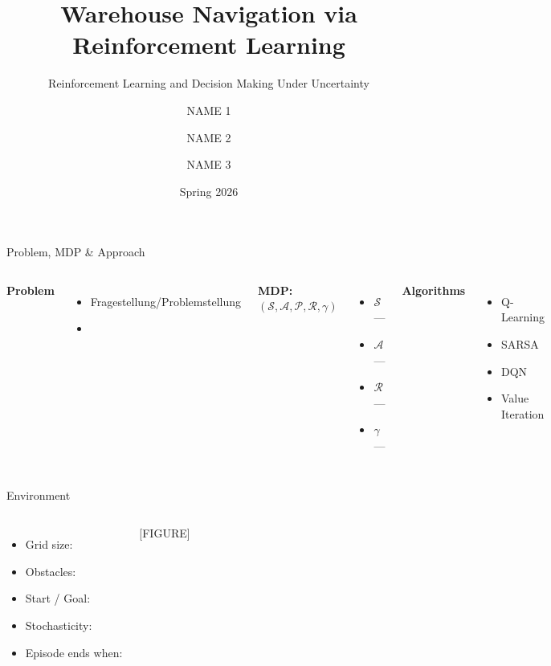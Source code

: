 \documentclass[aspectratio=169]{beamer}
\title{Warehouse Navigation via Reinforcement Learning}
\subtitle{Reinforcement Learning and Decision Making Under Uncertainty}
\author{NAME 1 \and NAME 2 \and NAME 3}
\institute{University Name}
\date{Spring 2026}
\newcommand{\states}{\ensuremath{\mathcal{S}}}
\newcommand{\actions}{\ensuremath{\mathcal{A}}}
\newcommand{\reward}{\ensuremath{\mathcal{R}}}
\newcommand{\transition}{\ensuremath{\mathcal{P}}}
\newcommand{\discount}{\ensuremath{\gamma}}
\begin{document}
\begin{frame}
  \titlepage
\end{frame}

\begin{frame}{Problem, MDP \& Approach}
  \begin{columns}
      \textbf{Problem}
      \begin{itemize}
        \item Fragestellung/Problemstellung
        \item
      \end{itemize}
      \textbf{MDP: } $(\states, \actions, \transition, \reward, \discount)$
      \begin{itemize}
        \item $\states$ —
        \item $\actions$ —
        \item $\reward$ —
        \item $\discount$ —
      \end{itemize}
      \textbf{Algorithms}
      \begin{itemize}
        \item Q-Learning
        \item SARSA
        \item DQN
        \item Value Iteration
      \end{itemize}
  \end{columns}
\end{frame}

\begin{frame}{Environment}
  \begin{columns}
      \begin{itemize}
        \item Grid size:
        \item Obstacles:
        \item Start / Goal:
        \item Stochasticity:
        \item Episode ends when:
      \end{itemize}
      [FIGURE]
  \end{columns}
\end{frame}
\end{document}
